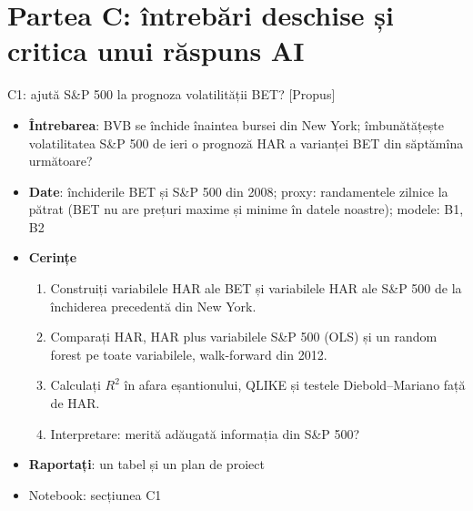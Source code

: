 \section{Partea C: întrebări deschise și critica unui răspuns AI}

\begin{frame}{C1: ajută S\&P 500 la prognoza volatilității BET? [Propus]}
\itemsize{\footnotesize}
\begin{itemize}
\item \textbf{Întrebarea}: BVB se închide înaintea bursei din New York; îmbunătățește volatilitatea S\&P 500 de ieri o prognoză HAR a varianței BET din săptămîna următoare?
\item \textbf{Date}: închiderile BET și S\&P 500 din 2008; proxy: randamentele zilnice la pătrat (BET nu are prețuri maxime și minime în datele noastre); modele: B1, B2
\item \textbf{Cerințe}
\begin{enumerate}
    \item Construiți variabilele HAR ale BET și variabilele HAR ale S\&P 500 de la închiderea precedentă din New York.
    \item Comparați HAR, HAR plus variabilele S\&P 500 (OLS) și un random forest pe toate variabilele, walk-forward din 2012.
    \item Calculați $R^2$ în afara eșantionului, QLIKE și testele Diebold--Mariano față de HAR.
    \item Interpretare: merită adăugată informația din S\&P 500?
\end{enumerate}
\item \textbf{Raportați}: un tabel și un plan de proiect
\item Notebook: secțiunea C1
\end{itemize}
\end{frame}

